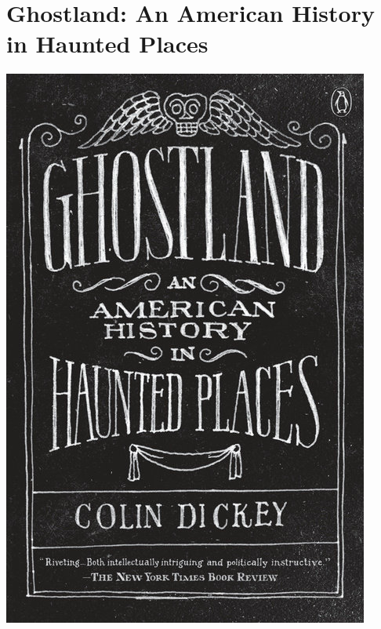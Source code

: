 \documentclass{tufte-handout}
\makeatletter
\newcommand{\varcaption}[2][0pt]{%
  \gsetlength{\@tufte@caption@vertical@offset}{-#1}%
  \gdef\@tufte@stored@varcaption{#2}%
}
\gdef\@tufte@stored@varcaption{} %
\makeatother
\begin{document}
\section*{Ghostland: An American History in Haunted Places}
\begin{marginfigure}[4\baselineskip]
   \includegraphics[width=\linewidth]{images/ghostland.jpg}
   \varcaption{\href{https://www.penguinrandomhouse.com/books/531470/ghostland-by-colin-dickey/9781101980200/}{Publisher Link}, \href{https://www.amazon.com/gp/product/1101980206/}{Amazon Link}}
\end{marginfigure}
\end{document}
